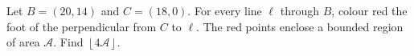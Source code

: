 Let $B=(20,14)$ and $C=(18,0)$. For every line $\ell$ through $B$, colour red the foot of the perpendicular from $C$ to $\ell$. The red points enclose a bounded region of area $\mathcal A$. Find $\left\lfloor4\mathcal A\right\rfloor$.

